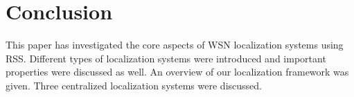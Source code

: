 \section{Conclusion}
This paper has investigated the core aspects of WSN localization systems using RSS. Different types of localization systems were introduced and important properties were discussed as well. An overview of our localization framework was given. Three centralized localization systems were discussed.